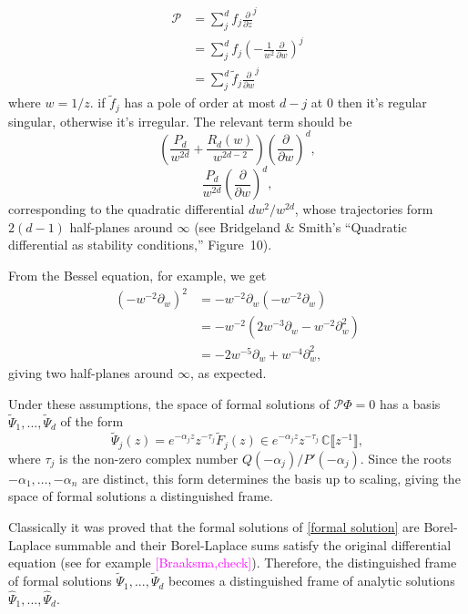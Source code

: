 \documentclass{article}
\theoremstyle{definition}
\newcommand{\C}{\mathbb{C}}
\newcommand{\series}[1]{\tilde{#1}}
\begin{document}
\begin{align*}
\mathcal{P} & = \sum_j^d f_j \frac{\partial}{\partial z}^j \\
& = \sum_j^d f_j \left(-\frac{1}{w^2} \frac{\partial}{\partial w}\right)^j\\
&=  \sum_j^d \tilde{f}_j \frac{\partial}{\partial w}^j
\end{align*}
where $w=1/z$.  if $\tilde{f}_j $ has a pole of order at most $d-j$ at 0 then it's regular singular, otherwise it's irregular. The relevant term should be
\color{Tan}
\[ \left(\frac{P_d}{w^{2d}} + \frac{R_d(w)}{w^{2d-2}}\right) \left(\frac{\partial}{\partial w}\right)^d , \]
\color{DarkTurquoise}
\[ \frac{P_d}{w^{2d}}  \left(\frac{\partial}{\partial w}\right)^d , \]
corresponding to the quadratic differential $dw^2/w^{2d}$, whose trajectories form $2(d-1)$ half-planes around $\infty$ (see Bridgeland \& Smith's ``Quadratic differential as stability conditions,'' Figure~10).

From the Bessel equation, for example, we get
\begin{align*}
(-w^{-2}\partial_w)^2&=-w^{-2}\partial_w(-w^{-2}\partial_w)\\
&=-w^{-2}(2w^{-3}\partial_w-w^{-2}\partial_w^2)\\
&=-2w^{-5}\partial_w+w^{-4}\partial_w^2,
\end{align*}
giving two half-planes around $\infty$, as expected.
\color{black}

Under these assumptions, the space of formal solutions of $\mathcal{P}\Phi = 0$ has a basis $\series{\Psi}_1,...,\series{\Psi}_d$ of the form~\cite{int-irreg}\cite[Proposition~2.2.7, p.~111]{EcalleIII}
\begin{equation}\label{formal solution}
\series{\Psi}_j(z)=e^{-\alpha_j z}z^{-\tau_j}\series{F}_j(z)\in e^{-\alpha_j z } z^{-\tau_j}\,\C \llbracket z^{-1} \rrbracket,
\end{equation}
where $\tau_j$ is the non-zero complex number $Q(-\alpha_j)/P'(-\alpha_j)$. Since the roots $-\alpha_1, \ldots, -\alpha_n$ are distinct, this form determines the basis up to scaling, giving the space of formal solutions a distinguished frame.

Classically it was proved that the formal solutions of \eqref{formal solution} are Borel-Laplace summable and their Borel-Laplace sums satisfy the original differential equation (see for example \cite{ramis1991series,malgrange92,malgrange1995sommation,diverg-resurg--ii}\textcolor{magenta}{[Braaksma,check]}). Therefore, the distinguished frame of formal solutions $\series{\Psi}_1,...,\series{\Psi}_d$ becomes a distinguished frame of analytic solutions $\hat{\Psi}_1,...,\hat{\Psi}_d$.       
\end{document}
